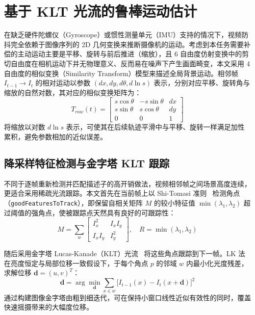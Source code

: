 \documentclass[10.5pt,twocolumn]{aaas}
\begin{document}
\section{基于 KLT 光流的鲁棒运动估计}

在缺乏硬件陀螺仪（Gyroscope）或惯性测量单元（IMU）支持的情况下，视频防抖完全依赖于图像序列的 2D 几何变换来推断摄像机的运动。考虑到本任务需要补偿的主动运动主要是平移、旋转与前后推进（缩放），且 6 自由度仿射变换中的剪切自由度在相机运动下并无物理意义、反而易在噪声下产生画面畸变，本文采用 4 自由度的相似变换（Similarity Transform）模型来描述全局背景运动。相邻帧 $I_{t-1}\!\to\!I_t$ 的相对运动以参数 $(dx, dy, d\theta, d\ln s)$ 表示，分别对应平移、旋转角与缩放的自然对数，其对应的相似变换矩阵为：
\begin{equation}
T_{raw}(t) = \begin{bmatrix} s\cos\theta & -s\sin\theta & dx \\ s\sin\theta & s\cos\theta & dy \\ 0 & 0 & 1 \end{bmatrix}
\end{equation}
将缩放以对数 $d\ln s$ 表示，可使其在后续轨迹平滑中与平移、旋转一样满足加性累积，避免参数相加的近似误差。

\subsection{降采样特征检测与金字塔 KLT 跟踪}
不同于逐帧重新检测并匹配描述子的高开销做法，视频相邻帧之间场景高度连续，更适合采用稀疏光流跟踪。本文首先在当前帧上以 Shi-Tomasi 准则~\cite{shitomasi1994} 检测角点（\texttt{goodFeaturesToTrack}），即保留自相关矩阵 $M$ 的较小特征值 $\min(\lambda_1,\lambda_2)$ 超过阈值的强角点，使被跟踪点天然具有良好的可跟踪性：
\begin{equation}
M = \sum_{w}\begin{bmatrix} I_x^2 & I_xI_y \\ I_xI_y & I_y^2 \end{bmatrix}, \quad R = \min(\lambda_1,\lambda_2)
\end{equation}

随后采用金字塔 Lucas-Kanade（KLT）光流~\cite{lucas1981,bouguet2001} 将这些角点跟踪到下一帧。LK 法在亮度恒定与局部位移一致假设下，于每个角点 $p$ 的邻域 $w$ 内最小化光度残差，求解位移 $\mathbf{d}=(u,v)^T$：
\begin{equation}
\mathbf{d} = \arg\min_{\mathbf{d}} \sum_{x\in w}\big[I_{t-1}(x) - I_t(x+\mathbf{d})\big]^2
\end{equation}
通过构建图像金字塔由粗到细迭代，可在保持小窗口线性近似有效性的同时，覆盖快速摇摄带来的大幅度位移。
\end{document}
